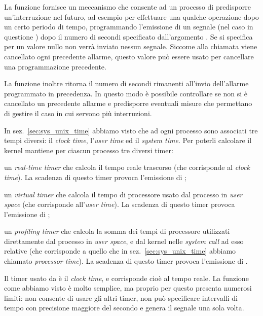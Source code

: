 La funzione fornisce un meccanismo che consente ad un processo di predisporre
un'interruzione nel futuro, ad esempio per effettuare una qualche operazione
dopo un certo periodo di tempo, programmando l'emissione di un segnale (nel
caso in questione ) dopo il numero di secondi specificato
dall'argomento . Se si specifica per  un valore
nullo non verrà inviato nessun segnale. Siccome alla chiamata viene cancellato
ogni precedente allarme, questo valore può essere usato per cancellare una
programmazione precedente.

La funzione inoltre ritorna il numero di secondi rimanenti all'invio
dell'allarme programmato in precedenza. In questo modo è possibile controllare
se non si è cancellato un precedente allarme e predisporre eventuali misure
che permettano di gestire il caso in cui servono più interruzioni.

In sez.~\ref{sec:sys_unix_time} abbiamo visto che ad ogni processo sono
associati tre tempi diversi: il \textit{clock time}, l'\textit{user time} ed
il \textit{system time}.  Per poterli calcolare il kernel mantiene per ciascun
processo tre diversi timer:
\begin{itemize*}
\item un \textit{real-time timer} che calcola il tempo reale trascorso (che
  corrisponde al \textit{clock time}). La scadenza di questo timer provoca
  l'emissione di ;
\item un \textit{virtual timer} che calcola il tempo di processore usato dal
  processo in \textit{user space} (che corrisponde all'\textit{user time}). La
  scadenza di questo timer provoca l'emissione di ;
\item un \textit{profiling timer} che calcola la somma dei tempi di processore
  utilizzati direttamente dal processo in \textit{user space}, e dal kernel
  nelle \textit{system call} ad esso relative (che corrisponde a quello che in
  sez.~\ref{sec:sys_unix_time} abbiamo chiamato \textit{processor time}). La
  scadenza di questo timer provoca l'emissione di .
\end{itemize*}

Il timer usato da  è il \textit{clock time}, e corrisponde cioè al
tempo reale. La funzione come abbiamo visto è molto semplice, ma proprio per
questo presenta numerosi limiti: non consente di usare gli altri timer, non
può specificare intervalli di tempo con precisione maggiore del secondo e
genera il segnale una sola volta.

